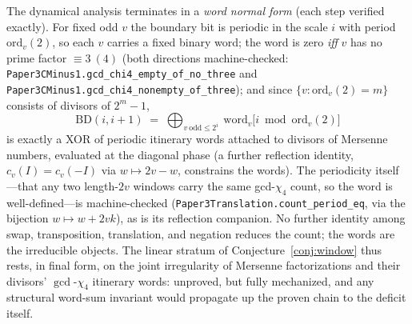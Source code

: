 \documentclass[11pt]{article}
\theoremstyle{remark}\newtheorem{remark}[theorem]{Remark}
\begin{document}
The dynamical analysis terminates in a \emph{word normal form} (each step verified exactly). For
fixed odd $v$ the boundary bit is periodic in the scale $i$ with period $\mathrm{ord}_v(2)$, so each
$v$ carries a fixed binary word; the word is zero \emph{iff} $v$ has no prime factor $\equiv3\ (4)$
(both directions machine-checked: \texttt{Paper3CMinus1.gcd\_chi4\_empty\_of\_no\_three} and
\texttt{Paper3CMinus1.gcd\_chi4\_nonempty\_of\_three}); and since $\{v:\mathrm{ord}_v(2)=m\}$ consists of divisors of
$2^m-1$,
\[
   \mathrm{BD}(i,i{+}1)\;=\;\bigoplus_{v\ \mathrm{odd}\le 2^i}\ \mathrm{word}_v\big[i\bmod
   \mathrm{ord}_v(2)\big]
\]
is exactly a XOR of periodic itinerary words attached to divisors of Mersenne numbers, evaluated at
the diagonal phase (a further reflection identity, $c_v(I)=c_v(-I)$ via $w\mapsto2v-w$, constrains
the words). The periodicity itself---that any two length-$2v$ windows carry the same gcd-$\chi_4$
count, so the word is well-defined---is machine-checked (\texttt{Paper3Translation.count\_period\_eq},
via the bijection $w\mapsto w+2vk$), as is its reflection companion. No further identity among swap,
transposition, translation, and negation reduces the count; the words are the irreducible objects. The linear stratum of Conjecture~\ref{conj:window} thus rests, in final
form, on the joint irregularity of Mersenne factorizations and their divisors' $\gcd$-$\chi_4$
itinerary words: unproved, but fully mechanized, and any structural word-sum invariant would
propagate up the proven chain to the deficit itself.
\end{document}
